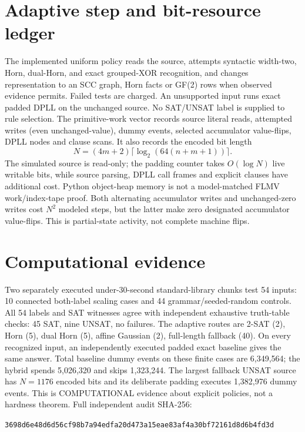\documentclass[11pt]{article}
\begin{document}
\section{Adaptive step and bit-resource ledger}
The implemented uniform policy reads the source, attempts syntactic width-two, Horn, dual-Horn, and exact grouped-XOR recognition, and changes representation to an SCC graph, Horn facts or GF(2) rows when observed evidence permits. Failed tests are charged. An unsupported input runs exact padded DPLL on the unchanged source. No SAT/UNSAT label is supplied to rule selection. The primitive-work vector records source literal reads, attempted writes (even unchanged-value), dummy events, selected accumulator value-flips, DPLL nodes and clause scans. It also records the encoded bit length
\[
N=(4m+2)\lceil\log_2(64(n+m+1))\rceil.
\]
The simulated source is read-only; the padding counter takes $O(\log N)$ live writable bits, while source parsing, DPLL call frames and explicit clauses have additional cost. Python object-heap memory is not a model-matched FLMV work/index-tape proof. Both alternating accumulator writes and unchanged-zero writes cost $N^2$ modeled steps, but the latter make zero designated accumulator value-flips. This is partial-state activity, not complete machine flips.

\section{Computational evidence}
Two separately executed under-30-second standard-library chunks test 54 inputs: 10 connected both-label scaling cases and 44 grammar/seeded-random controls. All 54 labels and SAT witnesses agree with independent exhaustive truth-table checks: 45 SAT, nine UNSAT, no failures. The adaptive routes are 2-SAT (2), Horn (5), dual Horn (5), affine Gaussian (2), full-length fallback (40). On every recognized input, an independently executed padded exact baseline gives the same answer. Total baseline dummy events on these finite cases are 6,349,564; the hybrid spends 5,026,320 and skips 1,323,244. The largest fallback UNSAT source has $N=1176$ encoded bits and its deliberate padding executes 1,382,976 dummy events. This is COMPUTATIONAL evidence about explicit policies, not a hardness theorem. Full independent audit SHA-256:
\begin{center}\scriptsize\texttt{3698d6e48d6d56cf98b7a94edfa20d473a15eae83af4a30bf72161d8d6b4fd3d}\end{center}
\end{document}
